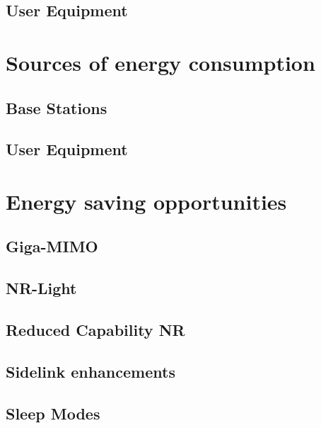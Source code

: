 \documentclass[11pt,a4paper]{article}
\begin{document}
\subsection{User Equipment}\label{subsec:UEInfluence}

\section{Sources of energy consumption}\label{sec:energyconsumption}
\subsection{Base Stations}\label{subsec:BSConsumption}
\subsection{User Equipment}\label{subsec:UEConsumption}

\section{Energy saving opportunities}\label{sec:opportunities}
\subsection{Giga-MIMO}\label{subsec:gigamimo}
\subsection{NR-Light}\label{subsec:nrlight}
\subsection{Reduced Capability NR}\label{subsec:RedCap}
\subsection{Sidelink enhancements}\label{subsec:sidelink}
\subsection{Sleep Modes}\label{subsec:sleep}
\end{document}
